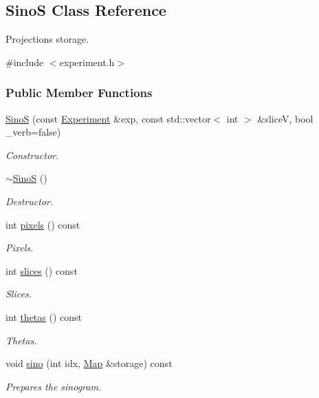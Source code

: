 \hypertarget{classSinoS}{
\subsection{SinoS Class Reference}
\label{classSinoS}
}


Projections storage.  




{\ttfamily \#include $<$experiment.h$>$}

\subsubsection*{Public Member Functions}
\begin{DoxyCompactItemize}
\item 
\hyperlink{classSinoS_aced97e9829fc64d373bfc0966b77f117}{SinoS} (const \hyperlink{classExperiment}{Experiment} \&exp, const std::vector$<$ int $>$ \&sliceV, bool \_\-verb=false)
\begin{DoxyCompactList}\small\item\em Constructor. \item\end{DoxyCompactList}\item 
\hyperlink{classSinoS_aef6be4c828951a2fc52dc12a5d219539}{$\sim$SinoS} ()
\begin{DoxyCompactList}\small\item\em Destructor. \item\end{DoxyCompactList}\item 
int \hyperlink{classSinoS_a0f91de289d2b60e2836788ddeb27acdb}{pixels} () const 
\begin{DoxyCompactList}\small\item\em Pixels. \item\end{DoxyCompactList}\item 
int \hyperlink{classSinoS_aa0dad0ac7153458f7358c98f97a87183}{slices} () const 
\begin{DoxyCompactList}\small\item\em Slices. \item\end{DoxyCompactList}\item 
int \hyperlink{classSinoS_a4bba409ea8a4effe932ed0a1a5e34942}{thetas} () const 
\begin{DoxyCompactList}\small\item\em Thetas. \item\end{DoxyCompactList}\item 
void \hyperlink{classSinoS_af8c857af0cdbe4c40409035564e99b81}{sino} (int idx, \hyperlink{group__Types_ga8747378c016fc11d9ecbb98787248c25}{Map} \&storage) const 
\begin{DoxyCompactList}\small\item\em Prepares the sinogram. \item\end{DoxyCompactList}\end{DoxyCompactItemize}

